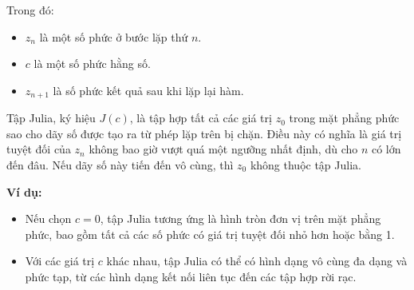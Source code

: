 \documentclass[oneside,final]{report}
\begin{document}
Trong đó:
\begin{itemize}
  \item $z_n$ là một số phức ở bước lặp thứ $n$.
  \item $c$ là một số phức hằng số.
  \item $z_{n+1}$ là số phức kết quả sau khi lặp lại hàm.
\end{itemize}
Tập Julia, ký hiệu $J(c)$, là tập hợp tất cả các giá trị $z_0$ trong mặt phẳng phức sao cho dãy số được tạo ra từ phép lặp trên bị chặn. Điều này có nghĩa là giá trị tuyệt đối của $z_n$ không bao giờ vượt quá một ngưỡng nhất định, dù cho $n$ có lớn đến đâu. Nếu dãy số này tiến đến vô cùng, thì $z_0$ không thuộc tập Julia.

\textbf{Ví dụ:}
\begin{itemize}
  \item Nếu chọn $c = 0$, tập Julia tương ứng là hình tròn đơn vị trên mặt phẳng phức, bao gồm tất cả các số phức có giá trị tuyệt đối nhỏ hơn hoặc bằng 1.
  \item Với các giá trị $c$ khác nhau, tập Julia có thể có hình dạng vô cùng đa dạng và phức tạp, từ các hình dạng kết nối liên tục đến các tập hợp rời rạc.
\end{itemize}
\end{document}
